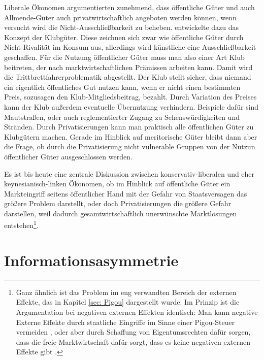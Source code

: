 Liberale Ökonomen argumentierten zunehmend, dass öffentliche Güter und auch Allmende-Güter auch privatwirtschaftlich angeboten werden können, wenn versucht wird die Nicht-Ausschließbarkeit zu beheben. \textcite{Buchanan1965} entwickelte dazu das Konzept der Klubgüter. Diese zeichnen sich zwar wie öffentliche Güter durch Nicht-Rivalität im Konsum aus, allerdings wird künstliche eine Ausschließbarkeit geschaffen. Für die Nutzung öffentlicher Güter muss man also einer Art Klub beitreten, der nach marktwirtschaftlichen Prämissen arbeiten kann. Damit wird die Trittbrettfahrerproblematik abgestellt. Der Klub stellt sicher, dass niemand ein eigentlich öffentliches Gut nutzen kann, wenn er nicht einen bestimmten Preis, sozusagen den Klub-Mitgliedsbeitrag, bezahlt. Durch Variation des Preises kann der Klub außerdem eventuelle Übernutzung verhindern. Beispiele dafür sind Mautstraßen, oder auch reglementierter Zugang zu Sehenswürdigkeiten und Stränden. Durch Privatisierungen kann man praktisch alle öffentlichen Güter zu Klubgütern machen. Gerade im Hinblick auf meritorische Güter bleibt dann aber die Frage, ob durch die Privatisierung nicht vulnerable Gruppen von der Nutzun öffentlicher Güter ausgeschlossen werden. 

Es ist bis heute eine zentrale Diskussion zwischen konservativ-liberalen und eher keynesianisch-linken Ökonomen, ob im Hinblick auf öffentliche Güter ein Markteingriff seitens öffentlicher Hand mit der Gefahr von Staatsversagen das größere Problem darstellt, oder doch Privatisierungen die größere Gefahr darstellen, weil dadurch gesamtwirtschaftlich unerwünschte Marktlösungen entstehen\footnote{Ganz ähnlich ist das Problem im eng verwandten Bereich der externen Effekte, das in Kapitel \ref{sec: Pigou} dargestellt wurde. Im Prinzip ist die Argumentation bei negativen externen Effekten identisch: Man kann negative Externe Effekte durch staatliche Eingriffe im Sinne einer Pigou-Steuer vermeiden \parencite{Pigou1920}, oder aber durch Schaffung von Eigentumsrechten dafür sorgen, dass die freie Marktwirtschaft dafür sorgt, dass es keine negativen externen Effekte gibt \parencite{Coase1960}.}.


\section{Informationsasymmetrie}
\label{Info}

